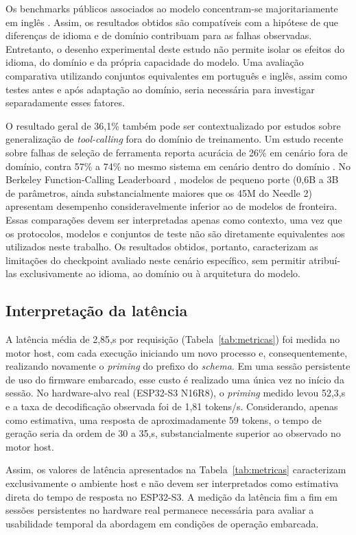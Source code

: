 \documentclass[12pt]{article}
\begin{document}
Os benchmarks públicos associados ao modelo concentram-se
majoritariamente em inglês \cite{ndubuaku2026controlled}. Assim, os
resultados obtidos são compatíveis com a hipótese de que diferenças de
idioma e de domínio contribuam para as falhas observadas. Entretanto, o
desenho experimental deste estudo não permite isolar os efeitos do
idioma, do domínio e da própria capacidade do modelo. Uma avaliação
comparativa utilizando conjuntos equivalentes em português e inglês,
assim como testes antes e após adaptação ao domínio, seria necessária
para investigar separadamente esses fatores.

O resultado geral de 36,1\% também pode ser contextualizado por estudos
sobre generalização de \textit{tool-calling} fora do domínio de
treinamento. Um estudo recente sobre falhas de seleção de ferramenta
reporta acurácia de 26\% em cenário fora de domínio, contra 57\% a 74\%
no mesmo sistema em cenário dentro do domínio
\cite{lookingnotpicking2026}. No Berkeley Function-Calling Leaderboard
\cite{bfclv4}, modelos de pequeno porte (0,6B a 3B de parâmetros, ainda
substancialmente maiores que os 45M do Needle 2) apresentam desempenho
consideravelmente inferior ao de modelos de fronteira. Essas comparações
devem ser interpretadas apenas como contexto, uma vez que os protocolos,
modelos e conjuntos de teste não são diretamente equivalentes aos
utilizados neste trabalho. Os resultados obtidos, portanto, caracterizam
as limitações do checkpoint avaliado neste cenário específico, sem
permitir atribuí-las exclusivamente ao idioma, ao domínio ou à
arquitetura do modelo.


\subsection{Interpretação da latência}

A latência média de 2,85,s por requisição (Tabela~\ref{tab:metricas}) foi
medida no motor host, com cada execução iniciando um novo processo e,
consequentemente, realizando novamente o \textit{priming} do prefixo do
\textit{schema}. Em uma sessão persistente de uso do firmware embarcado,
esse custo é realizado uma única vez no início da sessão. No hardware-alvo
real (ESP32-S3 N16R8), o \textit{priming} medido levou 52,3,s e a taxa de
decodificação observada foi de 1,81 tokens/s. Considerando, apenas como
estimativa, uma resposta de aproximadamente 59 tokens, o tempo de geração
seria da ordem de 30 a 35,s, substancialmente superior ao observado no
motor host.

Assim, os valores de latência apresentados na Tabela~\ref{tab:metricas}
caracterizam exclusivamente o ambiente host e não devem ser interpretados
como estimativa direta do tempo de resposta no ESP32-S3. A medição da
latência fim a fim em sessões persistentes no hardware real permanece
necessária para avaliar a usabilidade temporal da abordagem em condições
de operação embarcada.
\end{document}
